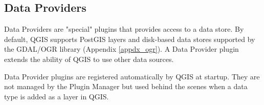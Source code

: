 \subsection{Data Providers}

Data Providers are "special" plugins that provides access to a data store.
By default, QGIS supports PostGIS layers and disk-based data stores supported by the GDAL/OGR library (Appendix \ref{appdx_ogr}).
A Data Provider plugin extends the ability of QGIS to use other data sources.

Data Provider plugins are registered automatically by QGIS at startup.
They are not managed by the Plugin Manager but used behind the scenes when a data type is added as a layer in QGIS.
